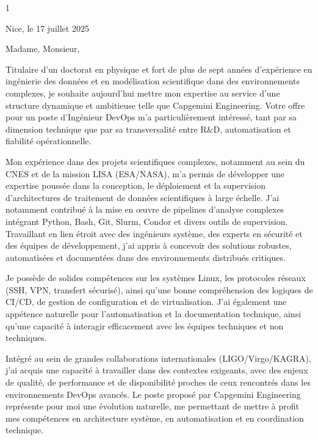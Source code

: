 \documentclass[10pt,a4paper]{altacv}
\begin{document}
\makecvheader


\begin{paracol}{1}



{\color{body}
\iffalse
Nice, le 17 juillet 2025

Madame, Monsieur,

Titulaire d'un doctorat en physique et fort de plus de sept années d'expérience en ingénierie des données et en modélisation scientifique dans des environnements complexes, je souhaite aujourd'hui mettre mon expertise au service d'une structure dynamique et ambitieuse telle que Capgemini Engineering. Votre offre pour un poste d'Ingénieur DevOps m'a particulièrement intéressé, tant par sa dimension technique que par sa transversalité entre R\&D, automatisation et fiabilité opérationnelle.

Mon expérience dans des projets scientifiques complexes, notamment au sein du CNES et de la mission LISA (ESA/NASA), m'a permis de développer une expertise poussée dans la conception, le déploiement et la supervision d'architectures de traitement de données scientifiques à large échelle. J'ai notamment contribué à la mise en œuvre de pipelines d'analyse complexes intégrant Python, Bash, Git, Slurm, Condor et divers outils de supervision. Travaillant en lien étroit avec des ingénieurs système, des experts en sécurité et des équipes de développement, j'ai appris à concevoir des solutions robustes, automatisées et documentées dans des environnements distribués critiques.

Je possède de solides compétences sur les systèmes Linux, les protocoles réseaux (SSH, VPN, transfert sécurisé), ainsi qu'une bonne compréhension des logiques de CI/CD, de gestion de configuration et de virtualisation. J'ai également une appétence naturelle pour l'automatisation et la documentation technique, ainsi qu'une capacité à interagir efficacement avec les équipes techniques et non techniques.

Intégré au sein de grandes collaborations internationales (LIGO/Virgo/KAGRA), j'ai acquis une capacité à travailler dans des contextes exigeants, avec des enjeux de qualité, de performance et de disponibilité proches de ceux rencontrés dans les environnements DevOps avancés. Le poste proposé par Capgemini Engineering représente pour moi une évolution naturelle, me permettant de mettre à profit mes compétences en architecture système, en automatisation et en coordination technique.

}
\end{paracol}
\end{document}

